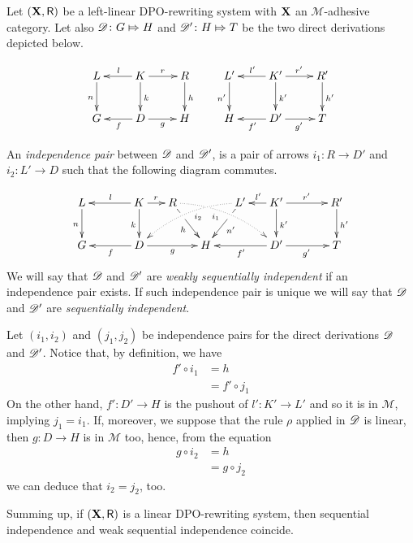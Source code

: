 \begin{definition}  Let $(\textbf {\textup{X}}, \mathsf{R})$ be a left-linear DPO-rewriting system with $\textbf {\textup{X}}$ an $\mathcal{M}$-adhesive category. Let also $\mathscr{D}\colon G\Mapsto H$ and $\mathscr{D'}\colon H\Mapsto T$ be the two direct derivations depicted below.
	
	\[\xymatrix{L \ar[d]_{n}& K \ar[d]^{k}\ar[l]_{l} \ar[r]^{r} & R \ar[d]^{h} & L' \ar[d]_{n'}& K' \ar[d]^{k'}\ar[l]_{l'} \ar[r]^{r'} & R' \ar[d]^{h'}\\G & \ar[l]^{f} D \ar[r]_{g}& H & H & \ar[l]^{f'} D' \ar[r]_{g'}& T}\]
	
	An \emph{independence pair} between $\mathscr{D}$ and $\mathscr{D'}$, is a pair of  arrows $i_1\colon R\to D'$ and $i_2\colon L'\to D$ such that the following diagram commutes.
	
	\[\xymatrix@C=15pt{L \ar[d]_{n}&& K \ar[d]_{k}\ar[ll]_{l} \ar[r]^{r} & R \ar@/^.35cm/@{.>}[drrr]|(.3)\hole_(.4){i_1} \ar[dr]|(.3)\hole_{h} && L' \ar@/_.35cm/@{.>}[dlll]^(.4){i_2} \ar[dl]|(.3)\hole^{n'}& K' \ar[d]^{k'}\ar[l]_{l'} \ar[rr]^{r'} && R' \ar[d]^{h'}\\G && \ar[ll]^{f} D \ar[rr]_{g}&& H  && \ar[ll]^{f'} D' \ar[rr]_{g'}&& T}\]
	We will say that $\mathscr{D}$ and $\mathscr{D'}$ are \emph{weakly sequentially independent} if an independence pair exists. If such independence pair is unique we will say that $\mathscr{D}$ and $\mathscr{D'}$ are \emph{sequentially independent}.
\end{definition}

\begin{example}
\end{example}
\begin{example}
\end{example}

\begin{remark}\label{rem:weak} Let $(i_1, i_2)$ and $(j_1, j_2)$ be independence pairs for the direct derivations $\mathscr{D}$ and $\mathscr{D'}$. Notice that, by definition, we have
	\begin{align*}f'\circ i_1&=h\\&=f'\circ j_1
	\end{align*}
	On the other hand, 
	$f'\colon D'\to H$ is  the pushout of $l'\colon K'\to L'$ and so it is in $\mathcal{M}$, implying $j_1=i_1$. If, moreover, we suppose that the rule $\rho$ applied in $\mathscr{D}$ is linear, then $g\colon D\to H$ is in $\mathcal{M}$ too, hence, from the equation
	\begin{align*}
		g\circ i_2&=h \\&= g\circ j_2
	\end{align*}
	we can deduce that $i_2=j_2$, too.
	
	Summing up, if $(\textbf {\textup{X}}, \mathsf{R})$ is a linear DPO-rewriting system, then sequential independence and weak sequential independence coincide. 
\end{remark}


